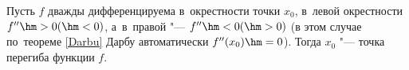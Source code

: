 
  Пусть $f$ дважды дифференцируема в~окрестности точки $x_0$, в~левой окрестности $f''\hm>0 (\hm<0)$, а~в~правой "--- $f''\hm<0 (\hm>0)$ (в этом случае
  по~теореме \ref{Darbu} Дарбу автоматически $f''(x_0)\hm=0$). Тогда $x_0$ "--- точка перегиба функции $f$.
